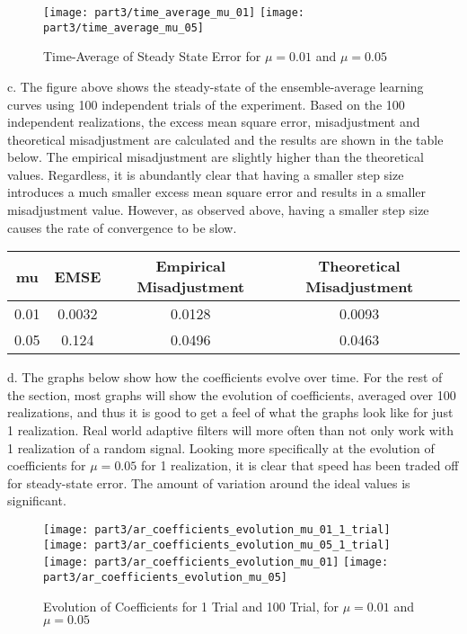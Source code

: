 \begin{figure}[H]
\centering{}
\texttt{[image: part3/time\_average\_mu\_01]}
\texttt{[image: part3/time\_average\_mu\_05]}
\caption{Time-Average of Steady State Error for $\mu=0.01$ and $\mu=0.05$}
\end{figure}


\noindent{}c. The figure above shows the steady-state of the ensemble-average learning curves using 100 independent trials of the experiment. Based on the 100 independent realizations, the excess mean square error, misadjustment and theoretical misadjustment are calculated and the results are shown in the table below. The empirical misadjustment are slightly higher than the theoretical values. Regardless, it is abundantly clear that having a smaller step size introduces a much smaller excess mean square error and results in a smaller misadjustment value. However, as observed above, having a smaller step size causes the rate of convergence to be slow.  

\begin{table}[H]
\centering
\begin{tabular}{|c|c|c|c|c|}
\hline
mu   & EMSE   & Empirical Misadjustment 	& Theoretical Misadjustment		\\ \hline
0.01 & 0.0032 & 0.0128                 	& 0.0093                   		\\ \hline
0.05 & 0.124  & 0.0496                 	& 0.0463                  		\\ \hline
\end{tabular}
\end{table}

\noindent{}d. The graphs below show how the coefficients evolve over time. For the rest of the section, most graphs will show the evolution of coefficients, averaged over 100 realizations, and thus it is good to get a feel of what the graphs look like for just 1 realization. Real world adaptive filters will more often than not only work with 1 realization of a random signal. Looking more specifically at the evolution of coefficients for $\mu=0.05$ for 1 realization, it is clear that speed has been traded off for steady-state error. The amount of variation around the ideal values is significant.

\begin{figure}[H]
\centering{}
\texttt{[image: part3/ar\_coefficients\_evolution\_mu\_01\_1\_trial]}
\texttt{[image: part3/ar\_coefficients\_evolution\_mu\_05\_1\_trial]} \\ 
\texttt{[image: part3/ar\_coefficients\_evolution\_mu\_01]}
\texttt{[image: part3/ar\_coefficients\_evolution\_mu\_05]}
\caption{Evolution of Coefficients for 1 Trial and 100 Trial, for $\mu=0.01$ and $\mu=0.05$}
\label{fig:steady_state_convergence}
\end{figure}

